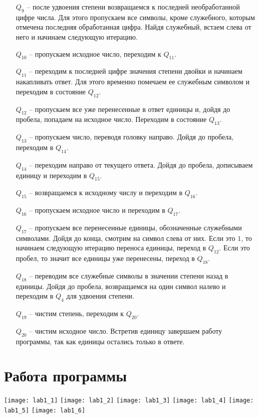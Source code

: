 \documentclass[a4paper,12pt]{article}
\begin{document}
\begin{itemize}
        \item[$Q_9$] -- после удвоения степени возвращаемся к последней необработанной цифре числа.
        Для этого пропускаем все символы, кроме служебного, которым отмечена последняя обработанная цифра.
        Найдя служебный, встаем слева от него и начинаем следующую итерацию.
        \item[$Q_{10}$] -- пропускаем исходное число, переходим к $Q_{11}$.
        \item[$Q_{11}$] -- переходим к последней цифре значения степени двойки и начинаем накапливать ответ.
        Для этого временно помечаем ее служебным символом и переходим в состояние $Q_{12}$.
        \item[$Q_{12}$] -- пропускаем все уже перенесенные в ответ единицы и, дойдя до пробела, попадаем на исходное число.
        Переходим в состояние $Q_{13}$.
        \item[$Q_{13}$] -- пропускаем число, переводя головку направо.
        Дойдя до пробела, переходим в $Q_{14}$.
        \item[$Q_{14}$] -- переходим направо от текущего ответа.
        Дойдя до пробела, дописываем единицу и переходим в $Q_{15}$.
        \item[$Q_{15}$] -- возвращаемся к исходному числу и переходим в $Q_{16}$.
        \item[$Q_{16}$] -- пропускаем исходное число и переходим в $Q_{17}$.
        \item[$Q_{17}$] -- пропускаем все перенесенные единицы, обозначенные служебными символами.
        Дойдя до конца, смотрим на символ слева от них.
        Если это $1$, то начинаем следующую итерацию переноса единицы, переход в $Q_{12}$.
        Если это пробел, то значит все единицы уже перенесены, переход в $Q_{18}$.
        \item[$Q_{18}$] -- переводим все служебные символы в значении степени назад в единицы.
        Дойдя до пробела, возвращаемся на один символ налево и переходим в $Q_4$ для удвоения степени.
        \item[$Q_{19}$] -- чистим степень, переходим к $Q_{20}$.
        \item[$Q_{20}$] -- чистим исходное число.
        Встретив единицу завершаем работу программы, так как единицы остались только в ответе.
    \end{itemize}

    \newpage

    \section{Работа программы}

    \begin{center}
        \texttt{[image: lab1\_1]}
        \texttt{[image: lab1\_2]}
        \texttt{[image: lab1\_3]}
        \texttt{[image: lab1\_4]}
        \texttt{[image: lab1\_5]}
        \texttt{[image: lab1\_6]}
    \end{center}
\end{document}

